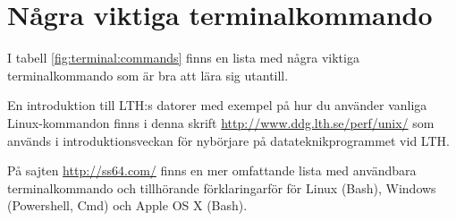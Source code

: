 \section{Några viktiga terminalkommando}

I tabell \ref{fig:terminal:commands} finns en lista med några viktiga terminalkommando som är bra att lära sig utantill.

En introduktion till LTH:s datorer med exempel på hur du använder vanliga Linux-kommandon finns i denna skrift \url{http://www.ddg.lth.se/perf/unix/} som används i introduktionsveckan för nybörjare på datateknikprogrammet vid LTH.

På sajten \url{http://ss64.com/} finns en mer omfattande lista med användbara terminalkommando och tillhörande förklaringarför för Linux (Bash), Windows (Powershell, Cmd) och Apple OS X (Bash).  

